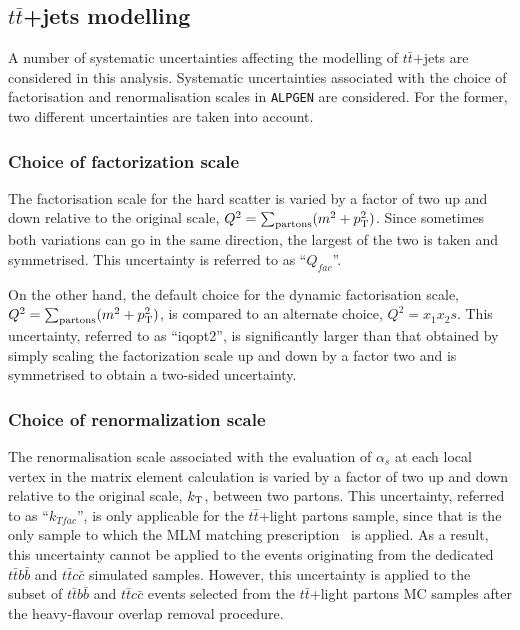 \subsection{$t\bar{t}$+jets modelling}
\label{sec:syst_ttbarmodelHTX}

A number of systematic uncertainties affecting 
the modelling of $t\bar{t}$+jets are considered
in this analysis. Systematic uncertainties associated 
with the choice of factorisation and renormalisation 
scales in \texttt{ALPGEN} are considered. For the former, 
two different uncertainties are taken into account.
\subsubsection*{Choice of factorization scale}
The factorisation scale for the hard scatter is varied by a factor of two up and down relative to the
original scale, $Q^2=\sum_{\rm partons} (m^2 + \pt^2)$.
Since sometimes both variations can go in the same direction, the largest of the two is taken and symmetrised.
This uncertainty is referred to as ``$Q_{fac}$''.

On the other hand, the default choice for the dynamic factorisation scale,
$Q^2=\sum_{\rm partons} (m^2 + \pt^2)$,  is compared to an alternate choice, $Q^2=x_1 x_2 s$. 
This uncertainty, referred to as ``iqopt2'', is significantly larger than 
that obtained by simply scaling the factorization scale up and down by a factor two 
and is symmetrised to obtain a two-sided uncertainty.

\subsubsection*{Choice of renormalization scale}
The renormalisation scale associated with the evaluation of $\alpha_s$ at each local
vertex in the matrix element calculation is varied by a factor of two
up and down relative to the original scale, $k_{\rm T}$, between two
partons.  
This uncertainty, referred to as ``$k_{Tfac}$'',
 is only applicable for the $t\bar{t}$+light partons
sample, since that is the only sample to which the 
MLM matching prescription~\cite{mlm} is
applied. As a result, this uncertainty cannot be applied to the events 
originating from the dedicated $t\bar{t}b\bar{b}$ and $t\bar{t}c\bar{c}$
simulated samples. However, this uncertainty is applied to the subset of 
$t\bar{t}b\bar{b}$ and $t\bar{t}c\bar{c}$
events selected from the $t\bar{t}$+light partons MC samples after the
heavy-flavour overlap removal procedure.



